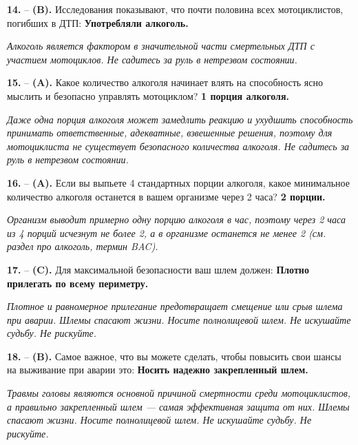 \begin{minipage}{\linewidth}
\noindent\textbf{14.}  -- \textbf {(B).} Исследования показывают, что почти половина всех мотоциклистов, погибших в ДТП:  \textbf {Употребляли алкоголь.} \par \textit {Алкоголь является фактором в значительной части смертельных ДТП с участием мотоциклов. Не садитесь за руль в нетрезвом состоянии.} \\
\end{minipage}

\begin{minipage}{\linewidth}
\noindent\textbf{15.}  -- \textbf {(A).} Какое количество алкоголя начинает влять на способность ясно мыслить и безопасно управлять мотоциклом?  \textbf {1 порция алкоголя.} \par \textit {Даже одна порция алкоголя может замедлить реакцию и ухудшить способность принимать ответственные, адекватные, взвешенные решения, поэтому для мотоциклиста не существует безопасного количества алкоголя. Не садитесь за руль в нетрезвом состоянии.} \\
\end{minipage}

\begin{minipage}{\linewidth}
\noindent\textbf{16.}  -- \textbf {(A).} Если вы выпьете 4 стандартных порции алкоголя, какое минимальное количество алкоголя останется в вашем организме через 2 часа?  \textbf {2 порции.} \par \textit {Организм выводит примерно одну порцию алкоголя в час, поэтому через 2 часа из 4 порций исчезнут не более 2, а в организме останется не менее 2 (см. раздел про алкоголь, термин BAC).} \\
\end{minipage}

\begin{minipage}{\linewidth}
\noindent\textbf{17.}  -- \textbf {(C).} Для максимальной безопасности ваш шлем должен:  \textbf {Плотно прилегать по всему периметру.} \par \textit {Плотное и равномерное прилегание предотвращает смещение или срыв шлема при аварии. Шлемы спасают жизни. Носите полнолицевой шлем. Не искушайте судьбу. Не рискуйте.} \\
\end{minipage}

\begin{minipage}{\linewidth}
\noindent\textbf{18.}  -- \textbf {(B).} Самое важное, что вы можете сделать, чтобы повысить свои шансы на выживание при аварии это:  \textbf {Носить надежно закрепленный шлем.} \par \textit {Травмы головы являются основной причиной смертности среди мотоциклистов, а правильно закрепленный шлем — самая эффективная защита от них. Шлемы спасают жизни. Носите полнолицевой шлем. Не искушайте судьбу. Не рискуйте.} \\
\end{minipage}

